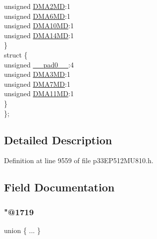 \begin{DoxyCompactItemize}
\begin{tabbing}
\>\>unsigned \hyperlink{structtag_p_m_d7_b_i_t_s_a5aa27a57c380306d428ef8f1b136c853}{DMA2MD}:1\\
\>\>unsigned \hyperlink{structtag_p_m_d7_b_i_t_s_a45ced33c82a8d8e14c1fae8d79b93dfb}{DMA6MD}:1\\
\>\>unsigned \hyperlink{structtag_p_m_d7_b_i_t_s_a5d0201beb1d1800bfcf78a38a50c5b36}{DMA10MD}:1\\
\>\>unsigned \hyperlink{structtag_p_m_d7_b_i_t_s_ab5c518167aaad7a2964264969fc23473}{DMA14MD}:1\\
\>\} \\
\>struct \{\\
\>\>unsigned \hyperlink{structtag_p_m_d7_b_i_t_s_adf71f3d8410c1f1dbbc96680a92c49af}{\_\_pad0\_\_}:4\\
\>\>unsigned \hyperlink{structtag_p_m_d7_b_i_t_s_a94c9c6fbd1d64ff89386c03957eb9c40}{DMA3MD}:1\\
\>\>unsigned \hyperlink{structtag_p_m_d7_b_i_t_s_a8249656f2b042e3c0d1f9bd9e27ba186}{DMA7MD}:1\\
\>\>unsigned \hyperlink{structtag_p_m_d7_b_i_t_s_a39a56acba61b47032183d1085d5f11b7}{DMA11MD}:1\\
\>\} \\
\}; \\

\end{tabbing}\end{DoxyCompactItemize}


\subsection{Detailed Description}


Definition at line 9559 of file p33\+E\+P512\+M\+U810.\+h.



\subsection{Field Documentation}
\mbox{\label{structtag_p_m_d7_b_i_t_s_ab3f8d4b730d4a7aa912b596df0b534c3}} 
\subsubsection{\texorpdfstring{"@1719}{@1719}}
{\footnotesize\ttfamily union \{ ... \} }

\mbox{\label{structtag_p_m_d7_b_i_t_s_adf71f3d8410c1f1dbbc96680a92c49af}} 
